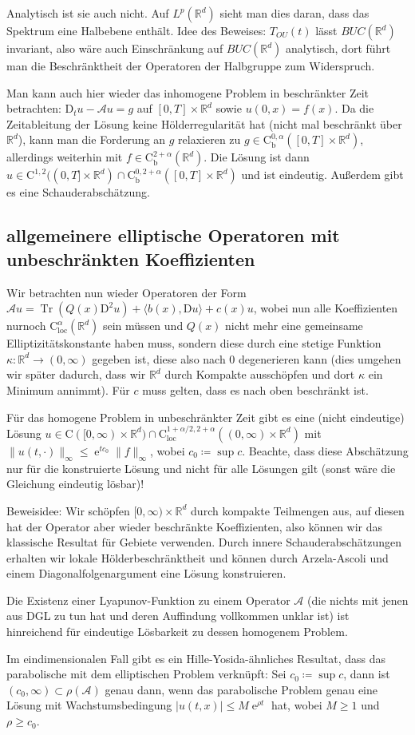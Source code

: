 \documentclass[11pt,a4paper]{scrartcl}
\newcommand{\R}{\mathbb{R}} %
\newcommand{\A}{\mathcal{A}}
\newcommand{\Cb}{\mathrm{C}_\mathrm{b}}
\theoremstyle{plain}
\theoremstyle{definition}
\theoremstyle{remark}
\DeclareMathOperator{\Tr}{Tr}
\DeclareMathOperator{\e}{e}
\begin{document}
Analytisch ist sie auch nicht. Auf $L^p(\R^d)$ sieht man dies daran, dass das Spektrum eine Halbebene enthält. Idee des Beweises: $T_{OU}(t)$ lässt $BUC(\R^d)$ invariant, also wäre auch Einschränkung auf $BUC(\R^d)$ analytisch, dort führt man die Beschränktheit der Operatoren der Halbgruppe zum Widerspruch.

Man kann auch hier wieder das inhomogene Problem in beschränkter Zeit betrachten: $\mathrm{D}_t u -\A u = g$ auf $[0,T]\times \R^d$ sowie $u(0,x)=f(x)$. Da die Zeitableitung der Lösung keine Hölderregularität hat (nicht mal beschränkt über $\R^d$), kann man die Forderung an $g$ relaxieren zu $g\in \Cb^{0,\alpha}([0,T]\times \R^d)$, allerdings weiterhin mit $f\in \Cb^{2+\alpha}(\R^d)$. Die Lösung ist dann $u\in \mathrm{C}^{1,2}((0,T]\times \R^d)\cap \Cb^{0,2+\alpha}([0,T]\times \R^d)$ und ist eindeutig. Außerdem gibt es eine Schauderabschätzung. 

\subsection{allgemeinere elliptische Operatoren mit unbeschränkten Koeffizienten}

Wir betrachten nun wieder Operatoren der Form $\A u = \Tr(Q(x)\mathrm{D}^2u)+\langle b(x), \mathrm{D}u\rangle + c(x)u$, wobei nun alle Koeffizienten nurnoch $\mathrm{C}_\mathrm{loc}^\alpha(\R^d)$ sein müssen und $Q(x)$ nicht mehr eine gemeinsame Elliptizitätskonstante haben muss, sondern diese durch eine stetige Funktion $\kappa: \R^d\to (0,\infty)$ gegeben ist, diese also nach $0$ degenerieren kann (dies umgehen wir später dadurch, dass wir $\R^d$ durch Kompakte ausschöpfen und dort $\kappa$ ein Minimum annimmt). Für $c$ muss gelten, dass es nach oben beschränkt ist. 

Für das homogene Problem in unbeschränkter Zeit gibt es eine (nicht eindeutige) Lösung $u\in \mathrm{C}([0,\infty)\times \R^d)\cap \mathrm{C}_\mathrm{loc}^{1+\alpha/2,2+\alpha}((0,\infty)\times \R^d)$ mit $\|u(t,\cdot)\|_\infty \leq \e^{tc_0}\|f\|_\infty$, wobei $c_0\coloneqq \sup c$. Beachte, dass diese Abschätzung nur für die konstruierte Lösung und nicht für alle Lösungen gilt (sonst wäre die Gleichung eindeutig lösbar)!

Beweisidee: Wir schöpfen $[0,\infty)\times \R^d$ durch kompakte Teilmengen aus, auf diesen hat der Operator aber wieder beschränkte Koeffizienten, also können wir das klassische Resultat für Gebiete verwenden. Durch innere Schauderabschätzungen erhalten wir lokale Hölderbeschränktheit und können durch Arzela-Ascoli und einem Diagonalfolgenargument eine Lösung konstruieren.

Die Existenz einer Lyapunov-Funktion zu einem Operator $\A$ (die nichts mit jenen aus DGL zu tun hat und deren Auffindung vollkommen unklar ist) ist hinreichend für eindeutige Lösbarkeit zu dessen homogenem Problem.

Im eindimensionalen Fall gibt es ein Hille-Yosida-ähnliches Resultat, dass das parabolische mit dem elliptischen Problem verknüpft: Sei $c_0\coloneqq \sup c$, dann ist $(c_0,\infty)\subset \rho(\A)$ genau dann, wenn das parabolische Problem genau eine Lösung mit Wachstumsbedingung $|u(t,x)|\leq M \e^{\rho t}$ hat, wobei $M\geq 1$ und $\rho \geq c_0$.
\end{document}
